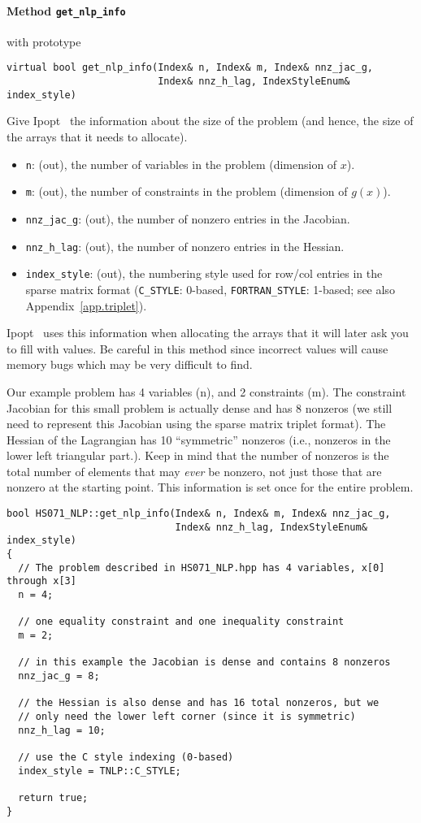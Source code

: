 \documentclass[10pt]{article}
\newcommand{\Ipopt}{{\sc Ipopt }}
\begin{document}
\paragraph{Method {\texttt{get\_nlp\_info}}} with prototype
\begin{verbatim}
virtual bool get_nlp_info(Index& n, Index& m, Index& nnz_jac_g,
                          Index& nnz_h_lag, IndexStyleEnum& index_style)
\end{verbatim}
Give \Ipopt\ the information about the size of the problem (and hence,
the size of the arrays that it needs to allocate). 
\begin{itemize}
\item {\tt n}: (out), the number of variables in the problem (dimension of $x$).
\item {\tt m}: (out), the number of constraints in the problem (dimension of $g(x)$).
\item {\tt nnz\_jac\_g}: (out), the number of nonzero entries in the Jacobian.
\item {\tt nnz\_h\_lag}: (out), the number of nonzero entries in the Hessian.
\item {\tt index\_style}: (out), the numbering style used for row/col entries in the sparse matrix
format ({\tt C\_STYLE}: 0-based, {\tt FORTRAN\_STYLE}: 1-based; see
also Appendix~\ref{app.triplet}).
\end{itemize}
\Ipopt\ uses this information when allocating the arrays that
it will later ask you to fill with values. Be careful in this method
since incorrect values will cause memory bugs which may be very
difficult to find.

Our example problem has 4 variables (n), and 2 constraints (m). The
constraint Jacobian for this small problem is actually dense and has 8
nonzeros (we still need to represent this Jacobian using the sparse
matrix triplet format). The Hessian of the Lagrangian has 10
``symmetric'' nonzeros (i.e., nonzeros in the lower left triangular
part.).  Keep in mind that the number of nonzeros is the total number
of elements that may \emph{ever} be nonzero, not just those that are
nonzero at the starting point. This information is set once for the
entire problem.

\begin{footnotesize}
\begin{verbatim}
bool HS071_NLP::get_nlp_info(Index& n, Index& m, Index& nnz_jac_g, 
                             Index& nnz_h_lag, IndexStyleEnum& index_style)
{
  // The problem described in HS071_NLP.hpp has 4 variables, x[0] through x[3]
  n = 4;

  // one equality constraint and one inequality constraint
  m = 2;

  // in this example the Jacobian is dense and contains 8 nonzeros
  nnz_jac_g = 8;

  // the Hessian is also dense and has 16 total nonzeros, but we
  // only need the lower left corner (since it is symmetric)
  nnz_h_lag = 10;

  // use the C style indexing (0-based)
  index_style = TNLP::C_STYLE;

  return true;
}
\end{verbatim}
\end{footnotesize}
\end{document}

